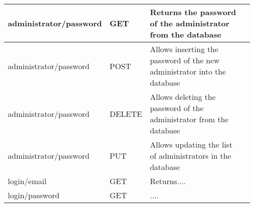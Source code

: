 \begin{longtable}{|p{}|p{} |p{}|p{}|}
administrator/password & GET & Returns the password of the administrator from the database\\\hline
administrator/password & POST & Allows inserting the password of the new administrator into the database \\\hline
administrator/password & DELETE & Allows deleting the password of the administrator from the database \\\hline
administrator/password & PUT & Allows updating the list of administrators in the database \\\hline

login/email & GET & Returns.... \\\hline
login/password & GET & .... \\\hline



\end{longtable}